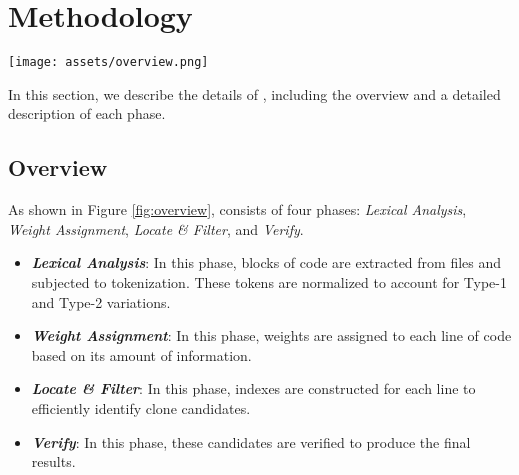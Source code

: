 

\section{Methodology}

\begin{figure*}[htbp]
    \centering
    \texttt{[image: assets/overview.png]}
    \caption{Overview of \toolname}
    \label{fig:overview}
\end{figure*}

In this section, we describe the details of \toolname, including the overview and a detailed description of each phase.

\subsection{Overview}
As shown in Figure \ref{fig:overview}, \toolname consists of four phases: \emph{Lexical Analysis}, \emph{Weight Assignment}, \emph{Locate \& Filter}, and \emph{Verify}.

\begin{itemize}
    \item \textbf{\emph{Lexical Analysis}}: In this phase, blocks of code are extracted from files and subjected to tokenization. These tokens are normalized to account for Type-1 and Type-2 variations.
    \item \textbf{\emph{Weight Assignment}}: In this phase, weights are assigned to each line of code based on its amount of information.
    \item \textbf{\emph{Locate \& Filter}}: In this phase, indexes are constructed for each line to efficiently identify clone candidates.
    \item \textbf{\emph{Verify}}: In this phase, these candidates are verified to produce the final results.
\end{itemize}

